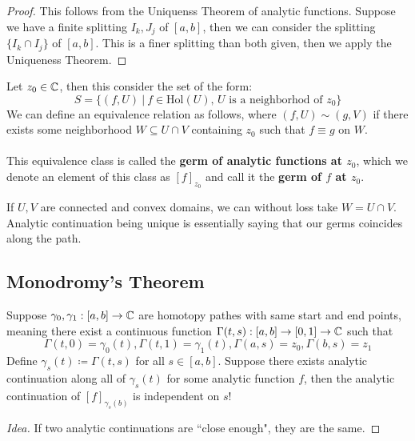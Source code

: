 \begin{proof}
    This follows from the Uniquenss Theorem of analytic functions. Suppose we have a finite splitting ${I_k}, {J_j}$ of $[a, b]$, then we can consider the splitting $\{I_k \cap I_j\}$ of $[a, b]$. This is a finer splitting than both given, then we apply the Uniqueness Theorem.
\end{proof}

\begin{definition}
    Let $z_0 \in \mathbb{C}$, then this consider the set of the form:
    \[S = \{(f, U)\ |\ \text{$f \in \text{Hol}(U)$, $U$ is a neighborhod of $z_0$}\}\]
    We can define an equivalence relation as follows, where $(f, U) \sim (g, V)$ if there exists some neighborhood $W \subseteq U \cap V$ containing $z_0$ such that $f \equiv g$ on $W$.\\\\
    This equivalence class is called the \textbf{germ of analytic functions at $z_0$}, which we denote an element of this class as $[f]_{z_0}$ and call it the \textbf{germ of $f$ at $z_0$}.
\end{definition}

\begin{remark}
    If $U, V$ are connected and convex domains, we can without loss take $W = U \cap V$. Analytic continuation being unique is essentially saying that our germs coincides along the path.
\end{remark}

\subsection{Monodromy's Theorem}
\begin{theorem}
    Suppose $\gamma_0, \gamma_1: [a, b] \to \mathbb{C}$ are homotopy pathes with same start and end points, meaning there exist a continuous function $\Gamma(t, s): [a, b] \to [0, 1] \to \mathbb{C}$ such that
    \[\Gamma(t, 0) = \gamma_0(t), \Gamma(t, 1) = \gamma_1(t), \Gamma(a, s) = z_0, \Gamma(b, s) = z_1\]
    Define $\gamma_s(t) \coloneqq \Gamma(t, s)$ for all $s \in [a, b]$. Suppose there exists analytic continuation along all of $\gamma_s(t)$ for some analytic function $f$, then the analytic continuation of $[f]_{\gamma_s(b)}$ is independent on $s$!
\end{theorem}

\begin{proof}[Idea]
    If two analytic continuations are ``close enough", they are the same.
\end{proof}

